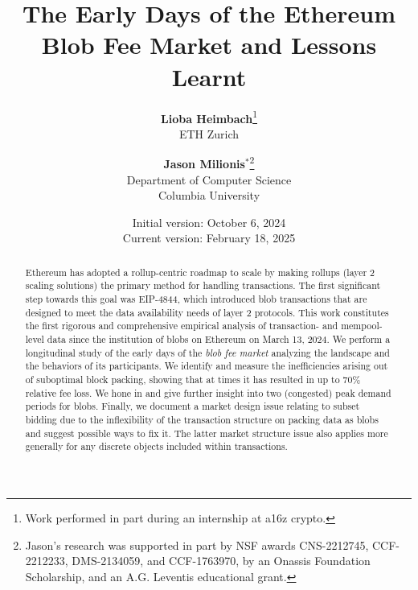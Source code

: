 \documentclass[11pt]{article}
\begin{document}
\title{The Early Days of the Ethereum Blob Fee Market and Lessons Learnt}


\author{
 	    \textbf{Lioba Heimbach}\footnote{Work performed in part during an internship at a16z crypto.}
        \\
 		\small ETH Zurich \\
 		\small {}
        \and
 	    \textbf{Jason Milionis}$^*$\footnote{Jason's research was supported in part by NSF awards CNS-2212745, CCF-2212233, DMS-2134059, and CCF-1763970, by an Onassis Foundation Scholarship, and an A.G. Leventis educational grant.}
        \\
        \small Department of Computer Science \\
 		\small Columbia University \\
 		\small {}
}
\date{Initial version: October 6, 2024 \\
      Current version: February 18, 2025
}
\maketitle

\thispagestyle{empty}

\begin{abstract}
Ethereum has adopted a rollup-centric roadmap to scale by making rollups (layer 2 scaling solutions) the primary method for handling transactions. The first significant step towards this goal was EIP-4844, which introduced blob transactions that are designed to meet the data availability needs of layer 2 protocols. This work constitutes the first rigorous and comprehensive empirical analysis of transaction- and mempool-level data since the institution of blobs on Ethereum on March 13, 2024. We perform a longitudinal study of the early days of the \emph{blob fee market} analyzing the landscape and the behaviors of its participants. We identify and measure the inefficiencies arising out of suboptimal block packing, showing that at times it has resulted in up to 70\% relative fee loss. We hone in and give further insight into two (congested) peak demand periods for blobs. Finally, we document a market design issue relating to subset bidding due to the inflexibility of the transaction structure on packing data as blobs and suggest possible ways to fix it. The latter market structure issue also applies more generally for any discrete objects included within transactions.
\end{abstract}
\end{document}
